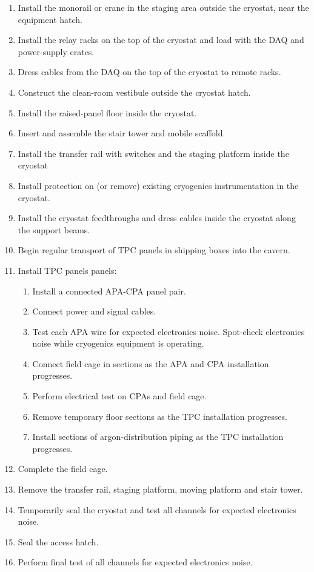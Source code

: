 \begin{enumerate}
\item Install the monorail or crane in the staging area outside the cryostat, near the equipment hatch.
\item Install the relay racks on the top of the cryostat and load with the DAQ and power-supply crates.
\item Dress cables from the DAQ on the top of the cryostat to remote racks.
\item Construct the clean-room vestibule outside the cryostat hatch.
\item Install the raised-panel floor inside the cryostat.
\item Insert and assemble the stair tower and mobile scaffold.  
\item Install the transfer rail with switches and the staging platform inside the cryostat
\item Install protection on (or remove) existing cryogenics instrumentation in the cryostat.
\item Install the cryostat feedthroughs and dress cables inside the cryostat along the support beams.
\item Begin regular transport of TPC panels in shipping boxes into the cavern.
\item Install TPC panels
panels:
\begin{enumerate}
\item Install a connected APA-CPA panel pair.
\item Connect power and signal cables.
\item Test each APA wire for expected electronics noise. Spot-check electronics noise while cryogenics equipment is operating.
\item Connect field cage in sections as the APA and CPA installation progresses.
\item Perform electrical test on CPAs and field cage.
\item Remove temporary floor sections as the TPC installation progresses.
\item Install sections of argon-distribution piping as the TPC installation progresses.
\end{enumerate}
\item Complete the field cage.
\item Remove the transfer rail, staging platform, moving platform and stair tower.
\item Temporarily seal the cryostat and test all channels for expected electronics noise.
\item Seal the access hatch.
\item Perform final test of all channels for expected electronics noise.
\end{enumerate}

